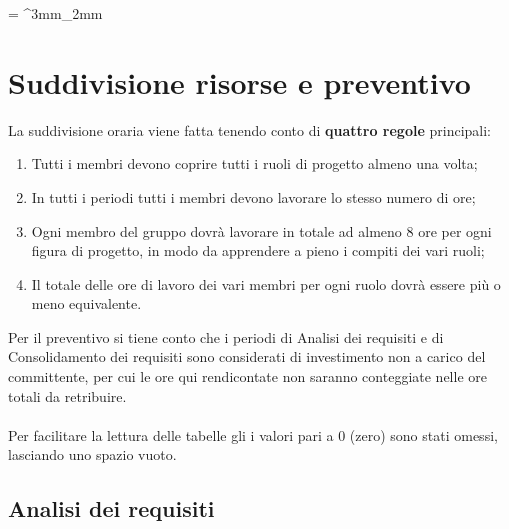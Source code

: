 \documentclass[PianoDiProgetto.tex]{subfiles}
\begin{document}
	
\tabulinesep = ^3mm_2mm

\chapter{Suddivisione risorse e preventivo}
La suddivisione oraria viene fatta tenendo conto di \textbf{quattro regole} principali:
\begin{enumerate}
	\item Tutti i membri devono coprire tutti i ruoli di progetto almeno una volta;
	\item In tutti i periodi tutti i membri devono lavorare lo stesso numero di ore;
	\item Ogni membro del gruppo dovrà lavorare in totale ad almeno 8 ore per ogni figura di progetto, in modo da apprendere a pieno i compiti dei vari ruoli;
	\item Il totale delle ore di lavoro dei vari membri per ogni ruolo dovrà essere più o meno equivalente.
\end{enumerate}
Per il preventivo si tiene conto che i periodi di Analisi dei requisiti e di Consolidamento dei requisiti sono considerati di investimento non a carico del committente, per cui le ore qui rendicontate non saranno conteggiate nelle ore totali da retribuire.\\\\
Per facilitare la lettura delle tabelle gli i valori pari a 0 (zero) sono stati omessi, lasciando uno spazio vuoto.
\newpage
\section{Analisi dei requisiti}
\end{document}
